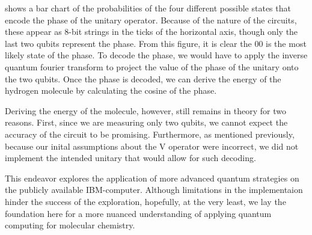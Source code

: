 \documentclass{article}
\begin{document}
 shows a bar chart of the probabilities of the four
different possible states that encode the phase of the unitary
operator. Because of the nature of the circuits, these appear as 8-bit
strings in the ticks of the horizontal axis, though only the last two
qubits represent the phase. From this figure, it is clear the 00 is the
most likely state of the phase. To decode the phase, we would have to
apply the inverse quantum fourier transform to project the value of
the phase of the unitary onto the two qubits. Once the phase is
decoded, we can derive the energy of the hydrogen molecule by
calculating the cosine of the phase.

Deriving the energy of the molecule, however, still remains in theory
for two reasons. First, since we are measuring only two qubits, we
cannot expect the accuracy of the circuit to be
promising. Furthermore, as mentioned previously, because our inital
assumptions about the V operator were incorrect, we did not implement
the intended unitary that would allow for such decoding.

This endeavor explores the application of more advanced quantum
strategies on the publicly available IBM-computer. Although
limitations in the implementaion hinder the success of the
exploration, hopefully, at the very least, we lay the foundation here
for a more nuanced understanding of applying quantum computing for
molecular chemistry.

\end{document}
